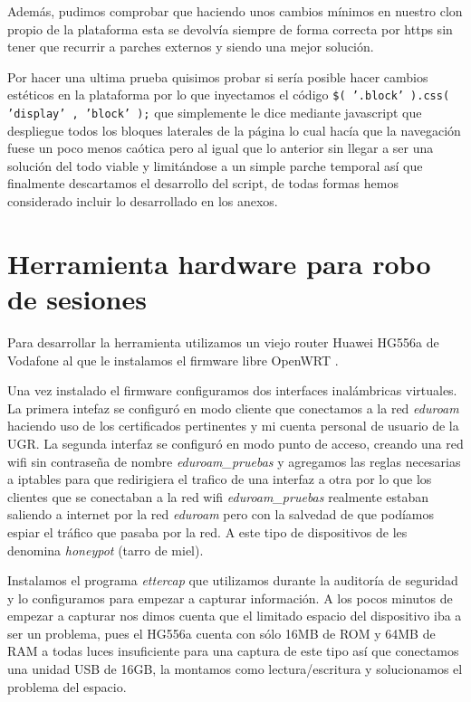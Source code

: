 Además, pudimos comprobar que haciendo unos cambios mínimos en nuestro clon propio de la plataforma esta se devolvía siempre de forma correcta por https sin tener que recurrir a parches externos y siendo una mejor solución.

Por hacer una ultima prueba quisimos probar si sería posible hacer cambios estéticos en la plataforma por lo que inyectamos el código \texttt{\$( '.block' ).css( 'display' , 'block' );} que simplemente le dice mediante javascript que despliegue todos los bloques laterales de la página lo cual hacía que la navegación fuese un poco menos caótica pero al igual que lo anterior sin llegar a ser una solución del todo viable y limitándose a un simple parche temporal así que finalmente descartamos el desarrollo del script, de todas formas hemos considerado incluir lo desarrollado en los anexos.


\section{Herramienta hardware para robo de sesiones}

Para desarrollar la herramienta utilizamos un viejo router Huawei HG556a de Vodafone al que le instalamos el firmware libre OpenWRT \cite{openwrt}. 

Una vez instalado el firmware configuramos dos interfaces inalámbricas virtuales. La primera intefaz se configuró en modo cliente que conectamos a la red \textit{eduroam} haciendo uso de los certificados pertinentes y mi cuenta personal de usuario de la UGR. La segunda interfaz se configuró en modo punto de acceso, creando una red wifi sin contraseña de nombre \textit{eduroam\_pruebas} y agregamos las reglas necesarias a iptables para que redirigiera el trafico de una interfaz a otra por lo que los clientes que se conectaban a la red wifi \textit{eduroam\_pruebas} realmente estaban saliendo a internet por la red \textit{eduroam} pero con la salvedad de que podíamos espiar el tráfico que pasaba por la red. A este tipo de dispositivos de les denomina \textit{honeypot} (tarro de miel). 

Instalamos el programa \textit{ettercap} que utilizamos durante la auditoría de seguridad y lo configuramos para empezar a capturar información. A los pocos minutos de empezar a capturar nos dimos cuenta que el limitado espacio del dispositivo iba a ser un problema, pues el HG556a cuenta con sólo 16MB de ROM y 64MB de RAM a todas luces insuficiente para una captura de este tipo así que conectamos una unidad USB de 16GB, la montamos como lectura/escritura y solucionamos el problema del espacio. 

